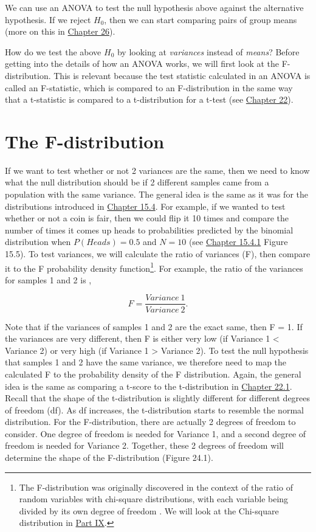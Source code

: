 \documentclass[
]{scrbook}
\begin{document}
We can use an ANOVA to test the null hypothesis above against the alternative hypothesis.
If we reject \(H_{0}\), then we can start comparing pairs of group means (more on this in \protect\hyperlink{Chapter_26}{Chapter 26}).

How do we test the above \(H_{0}\) by looking at \emph{variances} instead of \emph{means}?
Before getting into the details of how an ANOVA works, we will first look at the F-distribution.
This is relevant because the test statistic calculated in an ANOVA is called an F-statistic, which is compared to an F-distribution in the same way that a t-statistic is compared to a t-distribution for a t-test (see \protect\hyperlink{Chapter_22}{Chapter 22}).

\hypertarget{the-f-distribution}{%
\section{The F-distribution}\label{the-f-distribution}}

If we want to test whether or not 2 variances are the same, then we need to know what the null distribution should be if 2 different samples came from a population with the same variance.
The general idea is the same as it was for the distributions introduced in \protect\hyperlink{probability-distributions}{Chapter 15.4}.
For example, if we wanted to test whether or not a coin is fair, then we could flip it 10 times and compare the number of times it comes up heads to probabilities predicted by the binomial distribution when \(P(Heads) = 0.5\) and \(N = 10\) (see \protect\hyperlink{binomial-distribution}{Chapter 15.4.1} Figure 15.5).
To test variances, we will calculate the ratio of variances (F), then compare it to the F probability density function\footnote{The F-distribution was originally discovered in the context of the ratio of random variables with chi-square distributions, with each variable being divided by its own degree of freedom \citep{Miller2004}. We will look at the Chi-square distribution in \protect\hyperlink{Week9}{Part IX}.}.
For example, the ratio of the variances for samples 1 and 2 is \citep{Sokal1995},

\[F = \frac{Variance\:1}{Variance\:2}.\]

Note that if the variances of samples 1 and 2 are the exact same, then F = 1.
If the variances are very different, then F is either very low (if Variance 1 \textless{} Variance 2) or very high (if Variance 1 \textgreater{} Variance 2).
To test the null hypothesis that samples 1 and 2 have the same variance, we therefore need to map the calculated F to the probability density of the F distribution.
Again, the general idea is the same as comparing a t-score to the t-distribution in \protect\hyperlink{one-sample-t-test}{Chapter 22.1}.
Recall that the shape of the t-distribution is slightly different for different degrees of freedom (df).
As df increases, the t-distribution starts to resemble the normal distribution.
For the F-distribution, there are actually 2 degrees of freedom to consider.
One degree of freedom is needed for Variance 1, and a second degree of freedom is needed for Variance 2.
Together, these 2 degrees of freedom will determine the shape of the F-distribution (Figure 24.1).
\end{document}
